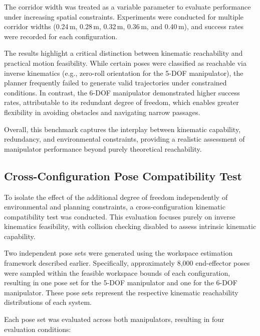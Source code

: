 \documentclass[conference]{IEEEtran}
\begin{document}
	The corridor width was treated as a variable parameter to evaluate performance under increasing spatial constraints. Experiments were conducted for multiple corridor widths (0.24\,m, 0.28\,m, 0.32\,m, 0.36\,m, and 0.40\,m), and success rates were recorded for each configuration. 
	
	The results highlight a critical distinction between kinematic reachability and practical motion feasibility. While certain poses were classified as reachable via inverse kinematics (e.g., zero-roll orientation for the 5-DOF manipulator), the planner frequently failed to generate valid trajectories under constrained conditions. In contrast, the 6-DOF manipulator demonstrated higher success rates, attributable to its redundant degree of freedom, which enables greater flexibility in avoiding obstacles and navigating narrow passages.
	
	Overall, this benchmark captures the interplay between kinematic capability, redundancy, and environmental constraints, providing a realistic assessment of manipulator performance beyond purely theoretical reachability.
	
	\subsection{Cross-Configuration Pose Compatibility Test}
	
	To isolate the effect of the additional degree of freedom independently of environmental and planning constraints, a cross-configuration kinematic compatibility test was conducted. This evaluation focuses purely on inverse kinematics feasibility, with collision checking disabled to assess intrinsic kinematic capability.
	
	Two independent pose sets were generated using the workspace estimation framework described earlier. Specifically, approximately 8,000 end-effector poses were sampled within the feasible workspace bounds of each configuration, resulting in one pose set for the 5-DOF manipulator and one for the 6-DOF manipulator. These pose sets represent the respective kinematic reachability distributions of each system.
	
	Each pose set was evaluated across both manipulators, resulting in four evaluation conditions:
	
\end{document}
